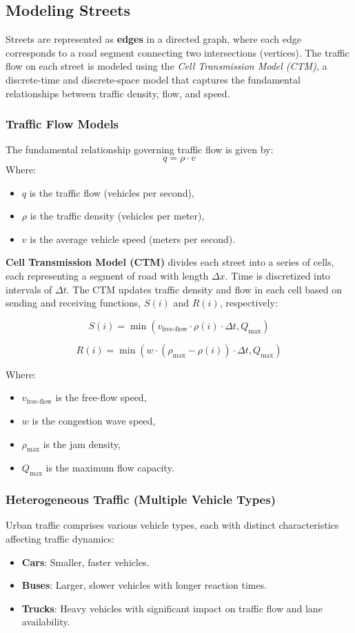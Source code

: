\documentclass[conference]{IEEEtran}
\begin{document}
\subsection{Modeling Streets}
Streets are represented as \textbf{edges} in a directed graph, where each edge corresponds to a road segment connecting two intersections (vertices). The traffic flow on each street is modeled using the \textit{Cell Transmission Model (CTM)}, a discrete-time and discrete-space model that captures the fundamental relationships between traffic density, flow, and speed.

\subsubsection{Traffic Flow Models}
The fundamental relationship governing traffic flow is given by:
\[
q = \rho \cdot v
\]
Where:
\begin{itemize}
    \item $q$ is the traffic flow (vehicles per second),
    \item $\rho$ is the traffic density (vehicles per meter),
    \item $v$ is the average vehicle speed (meters per second).
\end{itemize}

\textbf{Cell Transmission Model (CTM)} divides each street into a series of cells, each representing a segment of road with length $\Delta x$. Time is discretized into intervals of $\Delta t$. The CTM updates traffic density and flow in each cell based on sending and receiving functions, $S(i)$ and $R(i)$, respectively:

\[
S(i) = \min\left(v_{\text{free-flow}} \cdot \rho(i) \cdot \Delta t, Q_{\text{max}}\right)
\]

\[
R(i) = \min\left(w \cdot \left(\rho_{\text{max}} - \rho(i)\right) \cdot \Delta t, Q_{\text{max}}\right)
\]

Where:
\begin{itemize}
    \item $v_{\text{free-flow}}$ is the free-flow speed,
    \item $w$ is the congestion wave speed,
    \item $\rho_{\text{max}}$ is the jam density,
    \item $Q_{\text{max}}$ is the maximum flow capacity.
\end{itemize}

\subsubsection{Heterogeneous Traffic (Multiple Vehicle Types)}
Urban traffic comprises various vehicle types, each with distinct characteristics affecting traffic dynamics:
\begin{itemize}
    \item \textbf{Cars}: Smaller, faster vehicles.
    \item \textbf{Buses}: Larger, slower vehicles with longer reaction times.
    \item \textbf{Trucks}: Heavy vehicles with significant impact on traffic flow and lane availability.
\end{itemize}
\end{document}
